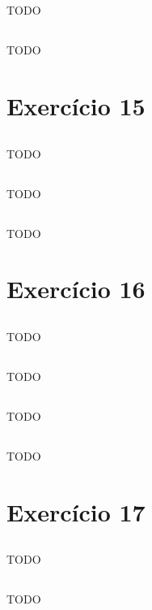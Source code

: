 \documentclass{article}
\begin{document}
\subsection{}
TODO
\subsection{}
TODO

\section{Exercício 15}
\subsection{}
TODO
\subsection{}
TODO
\subsection{}
TODO

\section{Exercício 16}
\subsection{}
TODO
\subsection{}
TODO
\subsection{}
TODO
\subsection{}
TODO

\section{Exercício 17}
\subsection{}
TODO
\subsection{}
TODO
\end{document}
